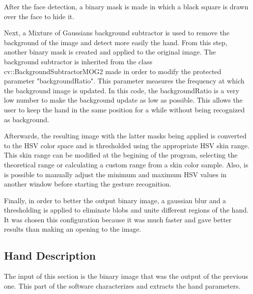 After the face detection, a binary mask is made in which a black square is drawn over the face to hide it.

Next, a Mixture of Gaussians background subtractor is used to remove the background of the image and detect more easily the hand. From this step, another binary mask is created and applied to the original image. 
The background subtractor is inherited from the class cv::BackgroundSubtractorMOG2 made in order to modify the protected parameter "backgroundRatio". This parameter measures the frequency at which the background image is updated. In this code, the backgroundRatio is a very low number to make the background update as low as possible. This allows the user to keep the hand in the same position for a while without being recognized as background.  

Afterwards, the resulting image with the latter masks being applied is converted to the HSV color space and is thresholded using the appropriate HSV skin range.
This skin range can be modified at the begining of the program, selecting the theoretical range or calculating a custom range from a skin color sample. Also, is is possible to manually adjust the minimum and maximum HSV values in another window before starting the gesture recognition. 

Finally, in order to better the output binary image, a gaussian blur and a thresholding is applied to eliminate blobs and unite different regions of the hand. It was chosen this configuration because it was much faster and gave better results than making an opening to the image. 

 
\subsection{Hand Description}

The input of this section is the binary image that was the output of the previous one. This part of the software characterizes and extracts the hand parameters. 

